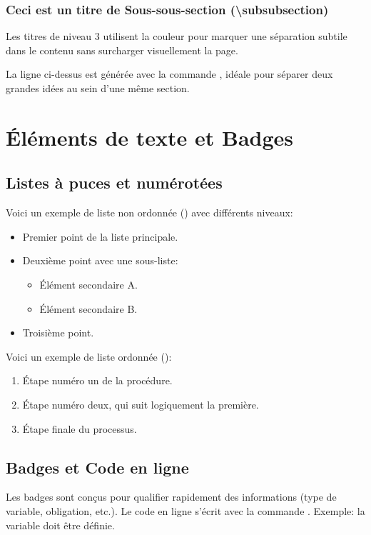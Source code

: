 \documentclass[theme=myrtille]{myrtille}
\begin{document}
\subsubsection{Ceci est un titre de Sous-sous-section (\textbackslash subsubsection)}
Les titres de niveau 3 utilisent la couleur  pour marquer une séparation subtile dans le contenu sans surcharger visuellement la page.

\hrulefull

La ligne ci-dessus est générée avec la commande , idéale pour séparer deux grandes idées au sein d'une même section.

\section{Éléments de texte et Badges}

\subsection{Listes à puces et numérotées}
Voici un exemple de liste non ordonnée () avec différents niveaux:
\begin{itemize}
    \item Premier point de la liste principale.
    \item Deuxième point avec une sous-liste:
    \begin{itemize}
        \item Élément secondaire A.
        \item Élément secondaire B.
    \end{itemize}
    \item Troisième point.
\end{itemize}

Voici un exemple de liste ordonnée ():
\begin{enumerate}
    \item Étape numéro un de la procédure.
    \item Étape numéro deux, qui suit logiquement la première.
    \item Étape finale du processus.
\end{enumerate}

\subsection{Badges et Code en ligne}
Les badges sont conçus pour qualifier rapidement des informations (type de variable, obligation, etc.). Le code en ligne s'écrit avec la commande . Exemple: la variable  doit être définie.
\end{document}
